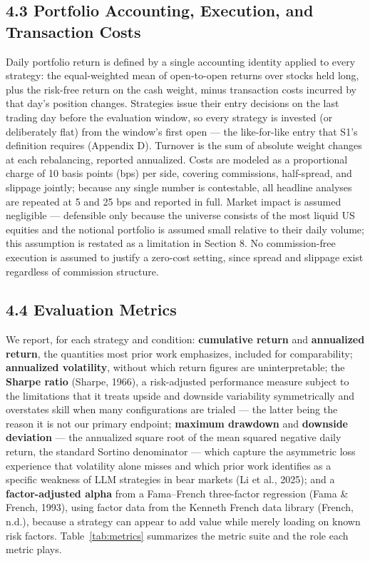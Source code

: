 \documentclass[
  12pt,
]{article}
\begin{document}
\hypertarget{portfolio-accounting-execution-and-transaction-costs}{%
\subsection{4.3 Portfolio Accounting, Execution, and Transaction
Costs}\label{portfolio-accounting-execution-and-transaction-costs}}

Daily portfolio return is defined by a single accounting identity
applied to every strategy: the equal-weighted mean of open-to-open
returns over stocks held long, plus the risk-free return on the cash
weight, minus transaction costs incurred by that day's position changes.
Strategies issue their entry decisions on the last trading day before
the evaluation window, so every strategy is invested (or deliberately
flat) from the window's first open --- the like-for-like entry that S1's
definition requires (Appendix D). Turnover is the sum of absolute weight
changes at each rebalancing, reported annualized. Costs are modeled as a
proportional charge of 10 basis points (bps) per side, covering
commissions, half-spread, and slippage jointly; because any single
number is contestable, all headline analyses are repeated at 5 and 25
bps and reported in full. Market impact is assumed negligible ---
defensible only because the universe consists of the most liquid US
equities and the notional portfolio is assumed small relative to their
daily volume; this assumption is restated as a limitation in Section 8.
No commission-free execution is assumed to justify a zero-cost setting,
since spread and slippage exist regardless of commission structure.

\hypertarget{evaluation-metrics}{%
\subsection{4.4 Evaluation Metrics}\label{evaluation-metrics}}

We report, for each strategy and condition: \textbf{cumulative return}
and \textbf{annualized return}, the quantities most prior work
emphasizes, included for comparability; \textbf{annualized volatility},
without which return figures are uninterpretable; the \textbf{Sharpe
ratio} (Sharpe, 1966), a risk-adjusted performance measure subject to
the limitations that it treats upside and downside variability
symmetrically and overstates skill when many configurations are trialed
--- the latter being the reason it is not our primary endpoint;
\textbf{maximum drawdown} and \textbf{downside deviation} --- the
annualized square root of the mean squared negative daily return, the
standard Sortino denominator --- which capture the asymmetric loss
experience that volatility alone misses and which prior work identifies
as a specific weakness of LLM strategies in bear markets (Li et al.,
2025); and a \textbf{factor-adjusted alpha} from a Fama--French
three-factor regression (Fama \& French, 1993), using factor data from
the Kenneth French data library (French, n.d.), because a strategy can
appear to add value while merely loading on known risk factors. Table~\ref{tab:metrics} summarizes the metric suite and the role each metric plays.
\end{document}
